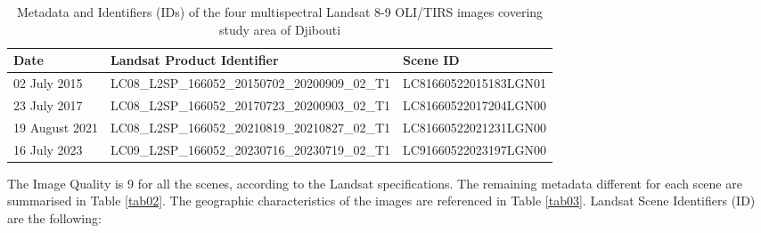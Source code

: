 \documentclass[jimaging,article,submit,pdftex,moreauthors]{Definitions/mdpi}
\begin{document}
\begin{table}[H]
\caption{Metadata and Identifiers (IDs) of the four multispectral Landsat 8-9 OLI/TIRS images covering study area of Djibouti}
\label{tab01}
\setlength\tabcolsep{0pt}
\begin{tabularx}{\textwidth}{ X l X }
\textbf{Date} & \textbf{Landsat Product Identifier} & \textbf{Scene ID} \\
\midrule
	02 July 2015 & LC08\_L2SP\_166052\_20150702\_20200909\_02\_T1 & LC81660522015183LGN01 \\
	23 July 2017 &  LC08\_L2SP\_166052\_20170723\_20200903\_02\_T1 & LC81660522017204LGN00 \\
	19 August 2021 & LC08\_L2SP\_166052\_20210819\_20210827\_02\_T1 & LC81660522021231LGN00 \\
	16 July 2023 & LC09\_L2SP\_166052\_20230716\_20230719\_02\_T1 & LC91660522023197LGN00 \\
\bottomrule
\end{tabularx}
\end{table} 

The Image Quality is 9 for all the scenes, according to the Landsat specifications. The remaining metadata different for each scene are summarised in Table \ref{tab02}. The geographic characteristics of the images are referenced in Table \ref{tab03}. {Landsat Scene Identifiers (ID) are the following: }
\end{document}
